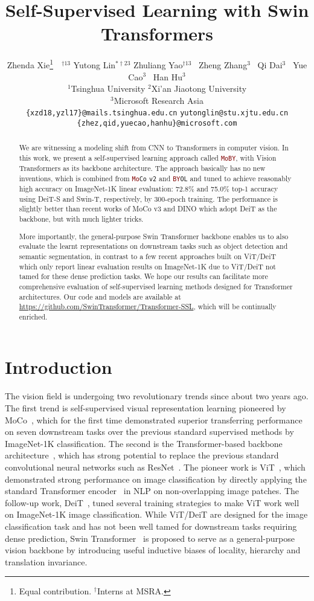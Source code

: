 \documentclass{article}
\title{Self-Supervised Learning with Swin Transformers}
\author{
   Zhenda Xie\thanks{Equal contribution. $^\dag$Interns at MSRA.}~~$^{\dag13}$ Yutong Lin$^{*\dag23}$ Zhuliang Yao$^{\dag13}$ ~Zheng Zhang$^3$ ~Qi Dai$^3$ ~Yue Cao$^3$ ~Han Hu$^3$\\
   $^1$Tsinghua University \quad $^2$Xi'an Jiaotong University \\
   $^3$Microsoft Research Asia \\
   \texttt{\{xzd18,yzl17\}@mails.tsinghua.edu.cn} \quad  \texttt{yutonglin@stu.xjtu.edu.cn} \\
   \texttt{\{zhez,qid,yuecao,hanhu\}@microsoft.com}
}
\begin{document}
\maketitle

\begin{abstract}

We are witnessing a modeling shift from CNN to Transformers in computer vision. In this work, we present a self-supervised learning approach called \textcolor{Maroon}{\texttt{MoBY}}, with Vision Transformers as its backbone architecture. The approach basically has no new inventions, which is combined from \textcolor{Maroon}{\texttt{Mo}}\texttt{Co} \texttt{v2} and \textcolor{Maroon}{\texttt{BY}}\texttt{OL} and tuned to achieve reasonably high accuracy on ImageNet-1K linear evaluation: 72.8\% and 75.0\% top-1 accuracy using DeiT-S and Swin-T, respectively, by 300-epoch training. The performance is slightly better than recent works of MoCo v3 and DINO which adopt DeiT as the backbone, but with much lighter tricks. 

More importantly, the general-purpose Swin Transformer backbone enables us to also evaluate the learnt representations on downstream tasks such as object detection and semantic segmentation, in contrast to a few recent approaches built on ViT/DeiT which only report linear evaluation results on ImageNet-1K due to ViT/DeiT not tamed for these dense prediction tasks. We hope our results can facilitate more comprehensive evaluation of self-supervised learning methods designed for Transformer architectures. Our code and models are available at \url{https://github.com/SwinTransformer/Transformer-SSL}, which will be continually enriched. 

\end{abstract}

\section{Introduction}

The vision field is undergoing two revolutionary trends since about two years ago. The first trend is self-supervised visual representation learning pioneered by MoCo~\citep{moco}, which for the first time demonstrated superior transferring performance on seven downstream tasks over the previous standard supervised methods by ImageNet-1K classification. The second is the Transformer-based backbone architecture~\citep{vit,deit,swin}, which has strong potential to replace the previous standard convolutional neural networks such as ResNet~\citep{resnet}. The pioneer work is ViT~\citep{vit}, which demonstrated strong performance on image classification by directly applying the standard Transformer encoder~\citep{attention} in NLP on non-overlapping image patches. The follow-up work, DeiT~\citep{deit}, tuned several training strategies to make ViT work well on ImageNet-1K image classification. While ViT/DeiT are designed for the image classification task and has not been well tamed for downstream tasks requiring dense prediction, Swin Transformer~\citep{swin} is proposed to serve as a general-purpose vision backbone by introducing useful inductive biases of locality, hierarchy and translation invariance.
\end{document}
